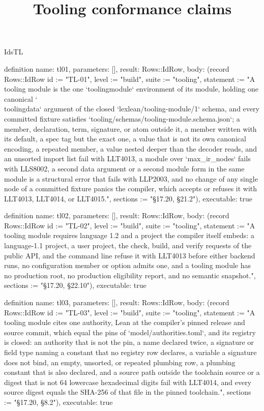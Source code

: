 \begin{lexlean}{IdsTL}
\title{Tooling conformance claims}
\begin{semanticmodule}
definition{
  name: tl01,
  parameters: [],
  result: Rows::IdRow,
  body: (record Rows::IdRow {id := "TL-01", level := "build", suite := "tooling", statement := "A tooling module is the one `toolingmodule` environment of its module, holding one canonical `\\toolingdata` argument of the closed `lexlean/tooling-module/1` schema, and every committed fixture satisfies `tooling/schemas/tooling-module.schema.json`; a member, declaration, term, signature, or atom outside it, a member written with its default, a spec tag but the exact one, a value that is not its own canonical encoding, a repeated member, a value nested deeper than the decoder reads, and an unsorted import list fail with LLT4013, a module over `max_ir_nodes` fails with LLS8002, a second data argument or a second module form in the same module is a structural error that fails with LLP2003, and no change of any single node of a committed fixture panics the compiler, which accepts or refuses it with LLT4013, LLT4014, or LLT4015.", sections := "§17.20, §21.2"}),
  executable: true
}

definition{
  name: tl02,
  parameters: [],
  result: Rows::IdRow,
  body: (record Rows::IdRow {id := "TL-02", level := "build", suite := "tooling", statement := "A tooling module requires language 1.2 and a project the compiler itself embeds: a language-1.1 project, a user project, the check, build, and verify requests of the public API, and the command line refuse it with LLT4013 before either backend runs, no configuration member or option admits one, and a tooling module has no production root, no production eligibility report, and no semantic snapshot.", sections := "§17.20, §22.10"}),
  executable: true
}

definition{
  name: tl03,
  parameters: [],
  result: Rows::IdRow,
  body: (record Rows::IdRow {id := "TL-03", level := "build", suite := "tooling", statement := "A tooling module cites one authority, Lean at the compiler's pinned release and source commit, which equal the pins of `model/authorities.toml`, and its registry is closed: an authority that is not the pin, a name declared twice, a signature or field type naming a constant that no registry row declares, a variable a signature does not bind, an empty, unsorted, or repeated plumbing row, a plumbing constant that is also declared, and a source path outside the toolchain source or a digest that is not 64 lowercase hexadecimal digits fail with LLT4014, and every source digest equals the SHA-256 of that file in the pinned toolchain.", sections := "§17.20, §8.2"}),
  executable: true
}


\end{semanticmodule}
\end{lexlean}
